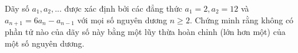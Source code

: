 \ifshowproblem
\begin{problem}\label{example:BGR-2015-MO-P1}
    Dãy số $a_1, a_2,...$ được xác định bởi các đẳng thức $a_1 = 2, a_2 = 12$ và $a_{n+1} = 6a_n-a_{n-1}$ với mọi số nguyên dương $n \ge 2$.
    Chứng minh rằng không có phần tử nào của dãy số này bằng một lũy thừa hoàn chỉnh (lớn hơn một) của một số nguyên dương.
\end{problem}
\fi

\footnotemark
{}
\fi